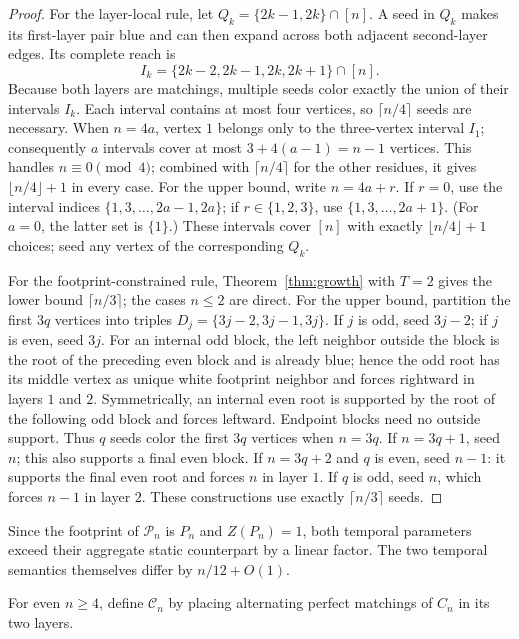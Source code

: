 \documentclass[11pt]{article}
\theoremstyle{definition}
\theoremstyle{remark}
\newcommand{\calP}{\mathcal{P}}
\newcommand{\calC}{\mathcal{C}}
\begin{document}
\begin{proof}
For the layer-local rule, let
$Q_k=\{2k-1,2k\}\cap[n]$.  A seed in $Q_k$ makes its first-layer pair blue
and can then expand across both adjacent second-layer edges.  Its complete
reach is
\[
 I_k=\{2k-2,2k-1,2k,2k+1\}\cap[n].
\]
Because both layers are matchings, multiple seeds color exactly the union of
their intervals $I_k$.  Each interval contains at most four vertices, so
$\lceil n/4\rceil$ seeds are necessary.  When $n=4a$, vertex $1$ belongs
only to the three-vertex interval $I_1$; consequently $a$ intervals cover at
most $3+4(a-1)=n-1$ vertices.  This handles $n\equiv0\pmod4$; combined with
$\lceil n/4\rceil$ for the other residues, it gives
$\lfloor n/4\rfloor+1$ in every case.  For the upper bound, write
$n=4a+r$.  If $r=0$, use the interval indices
$\{1,3,\ldots,2a-1,2a\}$; if $r\in\{1,2,3\}$, use
$\{1,3,\ldots,2a+1\}$.  (For $a=0$, the latter set is $\{1\}$.)  These
intervals cover $[n]$ with exactly
$\lfloor n/4\rfloor+1$ choices; seed any vertex of the corresponding $Q_k$.

For the footprint-constrained rule, Theorem~\ref{thm:growth} with $T=2$
gives the lower bound $\lceil n/3\rceil$; the cases $n\le2$ are direct.  For
the upper bound, partition the first $3q$ vertices into triples
$D_j=\{3j-2,3j-1,3j\}$.  If $j$ is odd, seed $3j-2$; if $j$ is even, seed
$3j$.  For an internal odd block, the left neighbor outside the block is the
root of the preceding even block and is already blue; hence the odd root has
its middle vertex as unique white footprint neighbor and forces rightward in
layers $1$ and $2$.  Symmetrically, an internal even root is supported by the
root of the following odd block and forces leftward.  Endpoint blocks need no
outside support.  Thus $q$ seeds color the first $3q$ vertices when
$n=3q$.  If $n=3q+1$, seed $n$; this also supports a final even block.  If
$n=3q+2$ and $q$ is even, seed $n-1$: it supports the final even root and
forces $n$ in layer $1$.  If $q$ is odd, seed $n$, which forces $n-1$ in
layer $2$.  These constructions use exactly $\lceil n/3\rceil$ seeds.
\end{proof}

Since the footprint of $\calP_n$ is $P_n$ and $Z(P_n)=1$, both temporal
parameters exceed their aggregate static counterpart by a linear factor.
The two temporal semantics themselves differ by $n/12+O(1)$.

For even $n\ge4$, define $\calC_n$ by placing alternating perfect matchings
of $C_n$ in its two layers.
\end{document}
